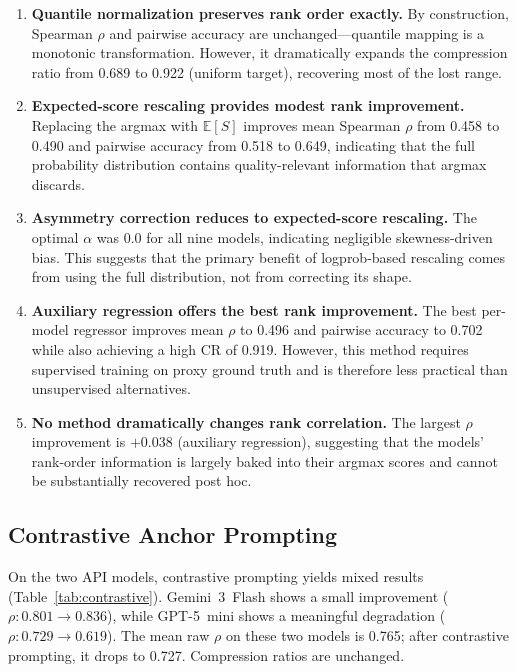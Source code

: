 \documentclass[11pt]{article}
\begin{document}
\begin{enumerate}[nosep]
    \item \textbf{Quantile normalization preserves rank order exactly.} By construction, Spearman $\rho$ and pairwise accuracy are unchanged---quantile mapping is a monotonic transformation. However, it dramatically expands the compression ratio from 0.689 to 0.922 (uniform target), recovering most of the lost range.
    \item \textbf{Expected-score rescaling provides modest rank improvement.} Replacing the argmax with $\mathbb{E}[S]$ improves mean Spearman $\rho$ from 0.458 to 0.490 and pairwise accuracy from 0.518 to 0.649, indicating that the full probability distribution contains quality-relevant information that argmax discards.
    \item \textbf{Asymmetry correction reduces to expected-score rescaling.} The optimal $\alpha$ was 0.0 for all nine models, indicating negligible skewness-driven bias. This suggests that the primary benefit of logprob-based rescaling comes from using the full distribution, not from correcting its shape.
    \item \textbf{Auxiliary regression offers the best rank improvement.} The best per-model regressor improves mean $\rho$ to 0.496 and pairwise accuracy to 0.702 while also achieving a high CR of 0.919. However, this method requires supervised training on proxy ground truth and is therefore less practical than unsupervised alternatives.
    \item \textbf{No method dramatically changes rank correlation.} The largest $\rho$ improvement is $+0.038$ (auxiliary regression), suggesting that the models' rank-order information is largely baked into their argmax scores and cannot be substantially recovered post hoc.
\end{enumerate}

\subsection{Contrastive Anchor Prompting}

On the two API models, contrastive prompting yields mixed results (Table~\ref{tab:contrastive}). Gemini~3~Flash shows a small improvement ($\rho: 0.801 \to 0.836$), while GPT-5~mini shows a meaningful degradation ($\rho: 0.729 \to 0.619$). The mean raw $\rho$ on these two models is 0.765; after contrastive prompting, it drops to 0.727. Compression ratios are unchanged.
\end{document}
